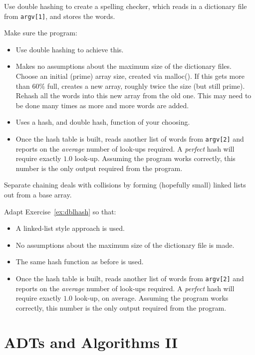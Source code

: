 \begin{exercise}
\label{ex:dblhash}
Use double hashing to create a spelling checker, which reads in a dictionary file
from \verb^argv[1]^, and stores the words.

Make sure the program:
\begin{itemize}
\item Use double hashing to achieve this.
\item Makes no assumptions about the maximum size of the dictionary files. Choose
an initial (prime) array size, created via malloc(). If this gets more than $60\%$ full,
creates a new array, roughly twice the size (but still prime). Rehash all the words into this
new array from the old one. This may need to be done many times as more and more words
are added.
\item Uses a hash, and double hash, function of your choosing.
\item Once the hash table is built, reads another list of words from \verb^argv[2]^
and reports on the {\em average} number of  look-ups required. A {\em perfect} hash
will require exactly $1.0$ look-up. Assuming the program works correctly,
this number is the only output required from the program.
\end{itemize}
\end{exercise}

Separate chaining deals with collisions by forming (hopefully small) linked lists
out from a base array.
\begin{exercise}
Adapt Exercise~\ref{ex:dblhash} so that:
\begin{itemize}
\item A linked-list style approach is used.
\item No assumptions about the maximum size of the dictionary file is made.
\item The same hash function as before is used.
\item Once the hash table is built, reads another list of words from \verb^argv[2]^
and reports on the {\em average} number of  look-ups required. A {\em perfect} hash
will require exactly $1.0$ look-up, on average. Assuming the program works correctly,
this number is the only output required from the program.
\end{itemize}
\end{exercise}



\chapter{ADTs and Algorithms II}

